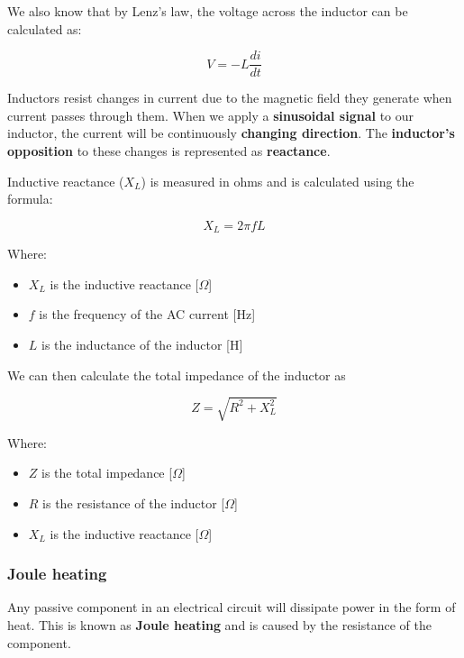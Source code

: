 We also know that by Lenz's law, the voltage across the inductor can be calculated as:

\begin{equation*}
    V = -L \frac{di}{dt}
\end{equation*}

Inductors resist changes in current due to the magnetic field they generate when current passes through them. When we apply a \textbf{sinusoidal signal} to our inductor, the current will be continuously \textbf{changing direction}. The \textbf{inductor's opposition} to these changes is represented as \textbf{reactance}.

Inductive reactance (\(X_L\)) is measured in ohms and is calculated using the formula:

\begin{equation*}
    X_L = 2\pi fL
\end{equation*}

Where:
\begin{itemize}
    \item \( X_L \) is the inductive reactance [\(\Omega\)]
    \item \( f \) is the frequency of the AC current [Hz]
    \item \( L \) is the inductance of the inductor [H]
\end{itemize}

\begin{samepage}
    We can then calculate the total impedance of the inductor as
    \nopagebreak

    \begin{equation*}
        Z = \sqrt{R^2 + X_L^2}
    \end{equation*}
    \nopagebreak

    Where:
    \nopagebreak

    \begin{itemize}
        \item \( Z \) is the total impedance [\(\Omega\)]
        \item \( R \) is the resistance of the inductor [\(\Omega\)]
        \item \( X_L \) is the inductive reactance [\(\Omega\)]
    \end{itemize} 
\end{samepage}


\subsubsection{Joule heating}
Any passive component in an electrical circuit will dissipate power in the form of heat. This is known as \textbf{Joule heating} and is caused by the resistance of the component.

